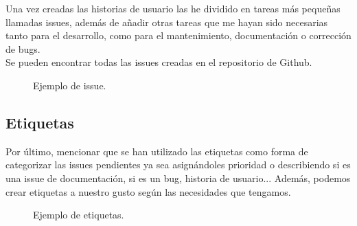 Una vez creadas las historias de usuario las he dividido en tareas más pequeñas llamadas issues, 
además de añadir otras tareas que me hayan sido necesarias tanto para el desarrollo, como para el mantenimiento, 
documentación o corrección de bugs.\\
Se pueden encontrar todas las issues creadas en el repositorio de Github\cite{issues}.

\begin{figure}[H]
	\centering
	\noindent{}
	\caption{Ejemplo de issue.}
  	\end{figure}


\newpage
\subsection{Etiquetas}

Por último, mencionar que se han utilizado las etiquetas como forma de categorizar las issues pendientes ya sea asignándoles prioridad o describiendo si es una issue de documentación, si es un bug, historia de usuario...
Además, podemos crear etiquetas a nuestro gusto según las necesidades que tengamos.

\begin{figure}[H]
	\centering
	\noindent{}
	\caption{Ejemplo de etiquetas.}
	\end{figure}